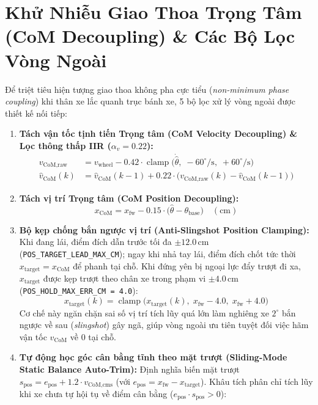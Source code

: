 \documentclass[10pt,a4paper,twocolumn]{article}
\begin{document}
\section{Khử Nhiễu Giao Thoa Trọng Tâm (CoM Decoupling) \& Các Bộ Lọc Vòng Ngoài}
Để triệt tiêu hiện tượng giao thoa không pha cực tiểu (\textit{non-minimum phase coupling}) khi thân xe lắc quanh trục bánh xe, 5 bộ lọc xử lý vòng ngoài được thiết kế nối tiếp:
\begin{enumerate}
    \item \textbf{Tách vận tốc tịnh tiến Trọng tâm (CoM Velocity Decoupling) \& Lọc thông thấp IIR ($\alpha_v = 0.22$):}
    \begin{align}
        v_{\text{CoM,raw}} &= v_{\text{wheel}} - 0.42 \cdot \operatorname{clamp}\big(\dot{\hat{\theta}},\; -60^\circ/\text{s},\; +60^\circ/\text{s}\big) \\
        \hat{v}_{\text{CoM}}(k) &= \hat{v}_{\text{CoM}}(k-1) + 0.22 \cdot \big(v_{\text{CoM,raw}}(k) - \hat{v}_{\text{CoM}}(k-1)\big)
    \end{align}
    \item \textbf{Tách vị trí Trọng tâm (CoM Position Decoupling):}
    \begin{equation}
        x_{\text{CoM}} = x_{\text{fw}} - 0.15 \cdot \big(\hat{\theta} - \theta_{\text{base}}\big) \quad (\text{cm})
    \end{equation}
    \item \textbf{Bộ kẹp chống bắn ngược vị trí (Anti-Slingshot Position Clamping):} Khi đang lái, điểm đích dẫn trước tối đa $\pm 12.0\,\text{cm}$ (\texttt{POS\_TARGET\_LEAD\_MAX\_CM}); ngay khi nhả tay lái, điểm đích chốt tức thời $x_{\text{target}} = x_{\text{CoM}}$ để phanh tại chỗ. Khi đứng yên bị ngoại lực đẩy trượt đi xa, $x_{\text{target}}$ được kẹp trượt theo chân xe trong phạm vi $\pm 4.0\,\text{cm}$ (\texttt{POS\_HOLD\_MAX\_ERR\_CM = 4.0}):
    \begin{equation}
        x_{\text{target}}(k) = \operatorname{clamp}\!\big(x_{\text{target}}(k),\; x_{\text{fw}} - 4.0,\; x_{\text{fw}} + 4.0\big)
    \end{equation}
    Cơ chế này ngăn chặn sai số vị trí tích lũy quá lớn làm nghiêng xe $2^\circ$ bắn ngược về sau (\textit{slingshot}) gây ngã, giúp vòng ngoài ưu tiên tuyệt đối việc hãm vận tốc $v_{\text{CoM}}$ về $0$ tại chỗ.
    \item \textbf{Tự động học góc cân bằng tĩnh theo mặt trượt (Sliding-Mode Static Balance Auto-Trim):} Định nghĩa biến mặt trượt $s_{\text{pos}} = e_{\text{pos}} + 1.2 \cdot v_{\text{CoM,cms}}$ (với $e_{\text{pos}} = x_{\text{fw}} - x_{\text{target}}$). Khâu tích phân chỉ tích lũy khi xe chưa tự hội tụ về điểm cân bằng ($e_{\text{pos}} \cdot s_{\text{pos}} > 0$):

\end{enumerate}
\end{document}
